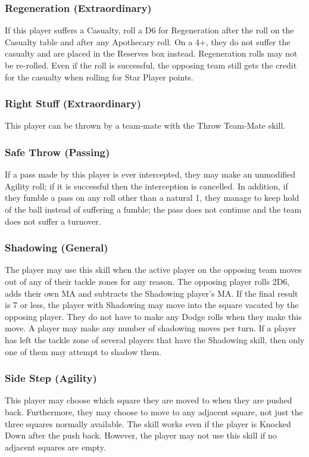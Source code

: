 \begin{multicols}{3}
\subsubsection{Regeneration (Extraordinary)}
\par If this player suffers a Casualty, roll a D6 for Regeneration after the roll on the Casualty table and after any Apothecary roll. On a 4+, they do not suffer the casualty and are placed in the Reserves box instead. Regeneration rolls may not be re-rolled. Even if the roll is successful, the opposing team still gets the credit for the casualty when rolling for Star Player points.

\subsubsection{Right Stuff (Extraordinary)}
\par This player can be thrown by a team-mate with the Throw Team-Mate skill.

\subsubsection{Safe Throw (Passing)}
\par If a pass made by this player is ever intercepted, they may make an unmodified Agility roll; if it is successful then the interception is cancelled. In addition, if they fumble a pass on any roll other than a natural 1, they manage to keep hold of the ball instead of suffering a fumble; the pass does not continue and the team does not suffer a turnover.

\subsubsection{Shadowing (General)}
\par The player may use this skill when the active player on the opposing team moves out of any of their tackle zones for any reason. The opposing player rolls 2D6, adds their own MA and subtracts the Shadowing player's MA. If the final result is 7 or less, the player with Shadowing may move into the square vacated by the opposing player. They do not have to make any Dodge rolls when they make this move. A player may make any number of shadowing moves per turn. If a player has left the tackle zone of several players that have the Shadowing skill, then only one of them may attempt to shadow them.

\subsubsection{Side Step (Agility)}
\par This player may choose which square they are moved to when they are pushed back. Furthermore, they may choose to move to any adjacent square, not just the three squares normally available. The skill works even if the player is Knocked Down after the push back. However, the player may not use this skill if no adjacent squares are empty.


\end{multicols}
